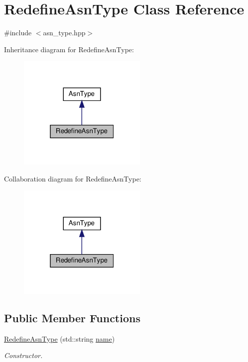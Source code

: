 \hypertarget{classRedefineAsnType}{}\section{Redefine\+Asn\+Type Class Reference}
\label{classRedefineAsnType}


{\ttfamily \#include $<$asn\+\_\+type.\+hpp$>$}



Inheritance diagram for Redefine\+Asn\+Type\+:
\nopagebreak
\begin{figure}[H]
\begin{center}
\leavevmode
\includegraphics[width=175pt]{d0/de1/classRedefineAsnType__inherit__graph}
\end{center}
\end{figure}


Collaboration diagram for Redefine\+Asn\+Type\+:
\nopagebreak
\begin{figure}[H]
\begin{center}
\leavevmode
\includegraphics[width=175pt]{db/dd6/classRedefineAsnType__coll__graph}
\end{center}
\end{figure}
\subsection*{Public Member Functions}
\begin{DoxyCompactItemize}
\item 
\hyperlink{classRedefineAsnType_a9b565e47e6bb941c50820361ff2c6a1a}{Redefine\+Asn\+Type} (std\+::string \hyperlink{classRedefineAsnType_abae8c5126b4432047963eb62d265ce6d}{name})
\begin{DoxyCompactList}\small\item\em Constructor. \end{DoxyCompactList}\end{DoxyCompactItemize}
